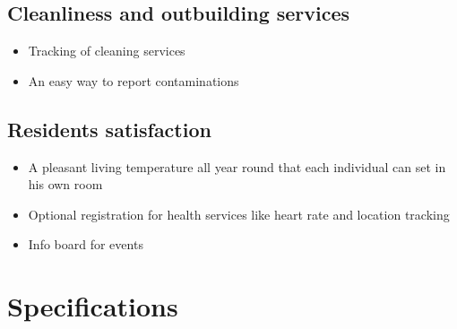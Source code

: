 \subsection{Cleanliness and outbuilding services}
\label{sec:orga2926ad}
\begin{itemize}
\item Tracking of cleaning services
\item An easy way to report contaminations
\end{itemize}
\subsection{Residents satisfaction}
\label{sec:orgd7a0521}
\begin{itemize}
\item A pleasant living temperature all year round that each individual can set in his own room
\item Optional registration for health services like heart rate and location tracking
\item Info board for events
\end{itemize}

\section{Specifications}
\label{sec:org1cd7898}

